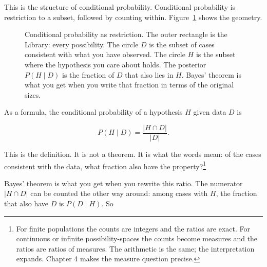 This is the structure of conditional probability. Conditional probability is restriction to a subset, followed by counting within. Figure~\ref{fig:bayes-counting} shows the geometry.

\begin{figure}[h]
\centering
{}
\caption{Conditional probability as restriction. The outer rectangle is the Library: every possibility. The circle $D$ is the subset of cases consistent with what you have observed. The circle $H$ is the subset where the hypothesis you care about holds. The posterior $P(H \mid D)$ is the fraction of $D$ that also lies in $H$. Bayes' theorem is what you get when you write that fraction in terms of the original sizes.}
\label{fig:bayes-counting}
\end{figure}

As a formula, the conditional probability of a hypothesis $H$ given data $D$ is

$$P(H \mid D) = \frac{|H \cap D|}{|D|}.$$

This is the definition. It is not a theorem. It is what the words mean: of the cases consistent with the data, what fraction also have the property?\footnote{For finite populations the counts are integers and the ratios are exact. For continuous or infinite possibility-spaces the counts become measures and the ratios are ratios of measures. The arithmetic is the same; the interpretation expands. Chapter 4 makes the measure question precise.}

Bayes' theorem is what you get when you rewrite this ratio. The numerator $|H \cap D|$ can be counted the other way around: among cases with $H$, the fraction that also have $D$ is $P(D \mid H)$. So

